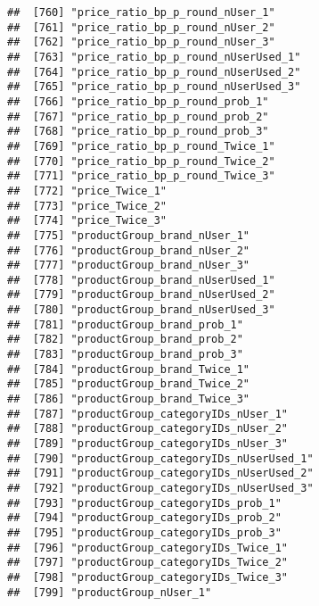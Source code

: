 \documentclass[10pt]{report}
\begin{document}
\begin{verbatim}
##  [760] "price_ratio_bp_p_round_nUser_1"                       
##  [761] "price_ratio_bp_p_round_nUser_2"                       
##  [762] "price_ratio_bp_p_round_nUser_3"                       
##  [763] "price_ratio_bp_p_round_nUserUsed_1"                   
##  [764] "price_ratio_bp_p_round_nUserUsed_2"                   
##  [765] "price_ratio_bp_p_round_nUserUsed_3"                   
##  [766] "price_ratio_bp_p_round_prob_1"                        
##  [767] "price_ratio_bp_p_round_prob_2"                        
##  [768] "price_ratio_bp_p_round_prob_3"                        
##  [769] "price_ratio_bp_p_round_Twice_1"                       
##  [770] "price_ratio_bp_p_round_Twice_2"                       
##  [771] "price_ratio_bp_p_round_Twice_3"                       
##  [772] "price_Twice_1"                                        
##  [773] "price_Twice_2"                                        
##  [774] "price_Twice_3"                                        
##  [775] "productGroup_brand_nUser_1"                           
##  [776] "productGroup_brand_nUser_2"                           
##  [777] "productGroup_brand_nUser_3"                           
##  [778] "productGroup_brand_nUserUsed_1"                       
##  [779] "productGroup_brand_nUserUsed_2"                       
##  [780] "productGroup_brand_nUserUsed_3"                       
##  [781] "productGroup_brand_prob_1"                            
##  [782] "productGroup_brand_prob_2"                            
##  [783] "productGroup_brand_prob_3"                            
##  [784] "productGroup_brand_Twice_1"                           
##  [785] "productGroup_brand_Twice_2"                           
##  [786] "productGroup_brand_Twice_3"                           
##  [787] "productGroup_categoryIDs_nUser_1"                     
##  [788] "productGroup_categoryIDs_nUser_2"                     
##  [789] "productGroup_categoryIDs_nUser_3"                     
##  [790] "productGroup_categoryIDs_nUserUsed_1"                 
##  [791] "productGroup_categoryIDs_nUserUsed_2"                 
##  [792] "productGroup_categoryIDs_nUserUsed_3"                 
##  [793] "productGroup_categoryIDs_prob_1"                      
##  [794] "productGroup_categoryIDs_prob_2"                      
##  [795] "productGroup_categoryIDs_prob_3"                      
##  [796] "productGroup_categoryIDs_Twice_1"                     
##  [797] "productGroup_categoryIDs_Twice_2"                     
##  [798] "productGroup_categoryIDs_Twice_3"                     
##  [799] "productGroup_nUser_1"                                 

\end{verbatim}
\end{document}
